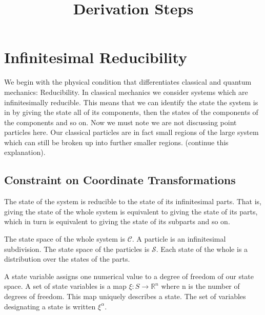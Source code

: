\documentclass{article}
\begin{document}
\title{Derivation Steps}

\section{Infinitesimal Reducibility}

	We begin with the physical condition that differentiates classical and quantum mechanics: Reducibility. In classical mechanics we consider systems which are infinitesimally reducible. This means that we can identify the state the system is in by giving the state all of its components, then the states of the components of the components and so on. Now we must note we are not discussing point particles here. Our classical particles are in fact small regions of the large system which can still be broken up into further smaller regions. (continue this explanation). 
	
\subsection{Constraint on Coordinate Transformations}

\begin{assump}
	The state of the system is reducible to the state of its infinitesimal parts. That is, giving the state of the whole system is equivalent to giving the state of its parts, which in turn is equivalent to giving the state of its subparts and so on.
\end{assump}

\begin{defn}
	The state space of the whole system is $\mathcal{C}$. A particle is an infinitesimal subdivision. The state space of the particles is $\mathcal{S}$. Each state of the whole is a distribution over the states of the parts.
\end{defn}


\begin{defn}
	A state variable assigns one numerical value to a degree of freedom of our state space. A set of state variables is a map $\xi : S \rightarrow \mathbb{R}^n $ where n is the number of degrees of freedom. This map uniquely describes a state. The set of variables designating a state is written $\xi^\alpha$.
\end{defn}
\end{document}
